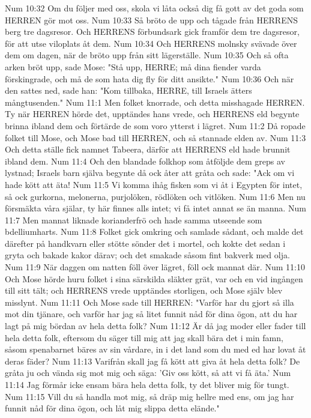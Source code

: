Num 10:32  Om du följer med oss, skola vi låta också dig få gott av det goda som HERREN gör mot oss.
Num 10:33  Så bröto de upp och tågade från HERRENS berg tre dagsresor. Och HERRENS förbundsark gick framför dem tre dagsresor, för att utse viloplats åt dem.
Num 10:34  Och HERRENS molnsky svävade över dem om dagen, när de bröto upp från sitt lägerställe.
Num 10:35  Och så ofta arken bröt upp, sade Mose: "Stå upp, HERRE; må dina fiender varda förskingrade, och må de som hata dig fly för ditt ansikte."
Num 10:36  Och när den sattes ned, sade han: "Kom tillbaka, HERRE, till Israels ätters mångtusenden."
Num 11:1  Men folket knorrade, och detta misshagade HERREN. Ty när HERREN hörde det, upptändes hans vrede, och HERRENS eld begynte brinna ibland dem och förtärde de som voro ytterst i lägret.
Num 11:2  Då ropade folket till Mose, och Mose bad till HERREN, och så stannade elden av.
Num 11:3  Och detta ställe fick namnet Tabeera, därför att HERRENS eld hade brunnit ibland dem.
Num 11:4  Och den blandade folkhop som åtföljde dem greps av lystnad; Israels barn själva begynte då ock åter att gråta och sade: "Ack om vi hade kött att äta!
Num 11:5  Vi komma ihåg fisken som vi åt i Egypten för intet, så ock gurkorna, melonerna, purjolöken, rödlöken och vitlöken.
Num 11:6  Men nu försmäkta våra själar, ty här finnes alls intet; vi få intet annat se än manna.
Num 11:7  Men mannat liknade korianderfrö och hade samma utseende som bdelliumharts.
Num 11:8  Folket gick omkring och samlade sådant, och malde det därefter på handkvarn eller stötte sönder det i mortel, och kokte det sedan i gryta och bakade kakor därav; och det smakade såsom fint bakverk med olja.
Num 11:9  När daggen om natten föll över lägret, föll ock mannat där.
Num 11:10  Och Mose hörde huru folket i sina särskilda släkter grät, var och en vid ingången till sitt tält; och HERRENS vrede upptändes storligen, och Mose själv blev misslynt.
Num 11:11  Och Mose sade till HERREN: "Varför har du gjort så illa mot din tjänare, och varför har jag så litet funnit nåd för dina ögon, att du har lagt på mig bördan av hela detta folk?
Num 11:12  Är då jag moder eller fader till hela detta folk, eftersom du säger till mig att jag skall bära det i min famn, såsom spenabarnet bäres av sin vårdare, in i det land som du med ed har lovat åt deras fäder?
Num 11:13  Varifrån skall jag få kött att giva åt hela detta folk? De gråta ju och vända sig mot mig och säga: 'Giv oss kött, så att vi få äta.'
Num 11:14  Jag förmår icke ensam bära hela detta folk, ty det bliver mig för tungt.
Num 11:15  Vill du så handla mot mig, så dräp mig hellre med ens, om jag har funnit nåd för dina ögon, och låt mig slippa detta elände."
